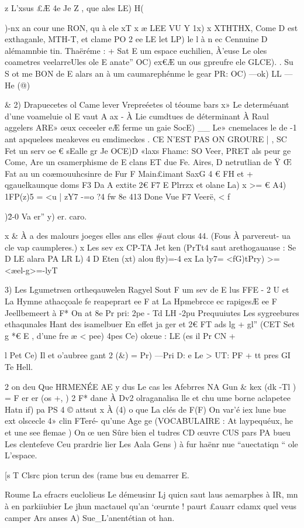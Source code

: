 \documentclass[12pt,a4paper]{article}
\begin{document}
z L'xsus £Æ 4e Je Z , que ales 
LE) H({)-nx 
an cour une RON, qu à ele xT x æ LEE VU Y 1x) x XTHTHX, Come D est exthaganle, MTH-T, et clame PO 2 ee LE let LP) le 
{l 
à 
n 
ec Cennuine D alémamnbie tin. Thaëréme : + Sat E um espace euchilien, À'euse Le oles coametres veelarreUles ole E } anate” OC) ex€Æ un ous gpreufre 
ele GLCE). . Su S ot me BON de E alars an à um caumarephénme 
le gear PR: OC) —ok) LL — He (@) 


& 2) Drapuecetes ol Came lever Vrepreéetes ol téoume bars 
x» Le determéuant d'une voameluie ol E vaut A ax - À Lie cumdtues de déterminant À Raul aggelers ARE» œux ceceeler eÆ ferme un gaie SocE) __ Le» cnemelaces le de -1 ant apquelees meakeves eu emdimeckes . CE N'EST PAS ON GROURE | , SC Fet un serv oe € sEalle gr Je OCE)D «laxs Fhamc: SO Veer, PRET als peur ge Come, Are un csamerphisme de E clans ET due Fe. Aires, D netrutlian de Ÿ Œ Fat au un coæmouuhcsinre de Fur F 
Main£imant  SaxG 4 € FH et + qgauelkaunque doms F3 Da A extite 2€ F7 E Plrrzx et olane 
La) x >= € A4) 1FP(z)5 = <u | zY7 -=o ?4 fw 8e 413 
Done Vue F7 Veerë, < f{)\=2-0 Va er” y) er. caro.


x & À a des malours joeges elles ans elles #aut clous 44. (Fous À parvereut- ua cle vap caumpleres.) 
x Les sev ex CP-TA Jet ken (PrTt4 saut arethogauause : Se D LE alara PA LR L) 4 
D Eten (xt) alou fly)=-4 ex La ly7= <fG)tPry) >= <æel-g>=-lyT 

3) Les Lgumetrsen ortheqauwelen 
Ragyel Sout F um sev de E lus FFE - 2 U et La Hymne athacçoale fe reapeprart ee F at La Hpmebrcce ec rapigesÆ ee F Jeellbemeert 
à F* 
On at 8e Pr pri: 2pe - Td LH -2pu 
Prequuiutes Les sygreebures ethaqunales Hant des isamelbuer En effet ja ger et 2€ FT ads lg + gl” (CET Set g *€ E , d'une fre 
æ < pee) 4pes Ce) olœue : LE (es il Pr CN + {l Pet Ce) Il et o'aubree gant 2 (&) = Pr) —Pri D: e Le > UT: PF + tt pres GI Te Hell.


2 
on deu Que HRMENÉE AE y dus Le cas les Afebrres 
NA Gun & kex (dk -Tl ) = F er er (os +, ) 2 F* dane À Dv2 olraganalisa lle et chu ume borne aclapetee 
Hatn if) pa PS 4 © attsut x À (4) o que La clés de F(F) On var'é iex lune bue ext olscecle 4» clin FTeré- qu'une Age ge (VOCABULAIRE : At laypequéux, he et une see flemae ) On œ uen Sûre bien el tudres CD œuvre CUS pars PA bueu Les clentefeve Ceu prardrie lier Les Aala Gens ) à fur haënr nue “auectatiqn “ ole L'espace. 

[s 
T Clsrc pion tcrun des (rame bus eu demarrer E.


Roume La efracrs euclolieus Le démeusinr Lj quicn saut laus aemarphes à IR, mn à en parkiiubier Le jhun mactauel qu'an ‘œurnte ! paurt £auarr cdamx quel veus camper Ars anses A) Sue_L'anentétian ot han.

}}}
\end{document}
